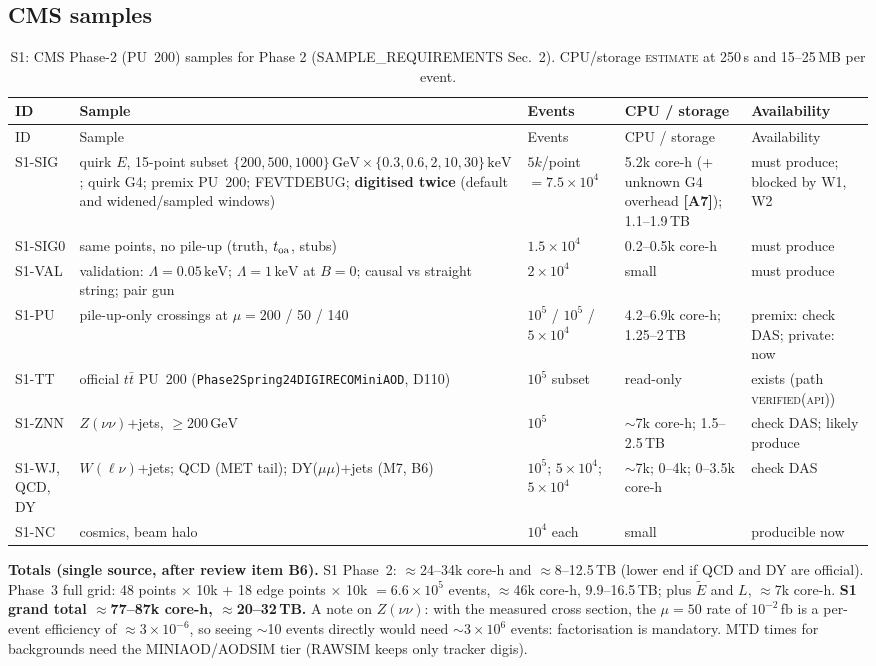 \documentclass[11pt,a4paper]{article}
\newcommand{\EST}{\textsc{estimate}}
\newcommand{\VAPI}{\textsc{verified(api)}}
\newcommand{\GeV}{\,\mathrm{GeV}}
\newcommand{\keV}{\,\mathrm{keV}}
\newcommand{\lab}[1]{\textbf{[#1]}}
\begin{document}
\subsection{CMS samples}
{\small
\begin{longtable}{@{}L{1.41cm}L{5.44cm}L{3.02cm}L{3.33cm}L{2.62cm}@{}}
\caption{S1: CMS Phase-2 (PU~200) samples for Phase 2 (SAMPLE\_REQUIREMENTS Sec.~2). CPU/storage \EST{} at 250\,s and 15--25\,MB per event.}\label{tab:s1}\\
\toprule ID & Sample & Events & CPU / storage & Availability\\\midrule\endfirsthead
\toprule ID & Sample & Events & CPU / storage & Availability\\\midrule\endhead
\bottomrule\endfoot
S1-SIG & quirk $E$, 15-point subset $\{200,500,1000\}\GeV\times\{0.3,0.6,2,10,30\}\keV$; quirk G4; premix PU~200; FEVTDEBUG; \textbf{digitised twice} (default and widened/sampled windows) & $5k$/point $=7.5\times10^4$ & 5.2k core-h (+ unknown G4 overhead \lab{A7}); 1.1--1.9\,TB & must produce; blocked by W1, W2\\
S1-SIG0 & same points, no pile-up (truth, $t_{\rm oa}$, stubs) & $1.5\times10^4$ & 0.2--0.5k core-h & must produce\\
S1-VAL & validation: $\Lambda=0.05\keV$; $\Lambda=1\keV$ at $B=0$; causal vs straight string; pair gun & $2\times10^4$ & small & must produce\\
S1-PU & pile-up-only crossings at $\mu=200$ / 50 / 140 & $10^5$ / $10^5$ / $5\times10^4$ & 4.2--6.9k core-h; 1.25--2\,TB & premix: check DAS; private: now\\
S1-TT & official $t\bar t$ PU~200 (\texttt{Phase2Spring24\allowbreak DIGIRECO\allowbreak MiniAOD}, D110) & $10^5$ subset & read-only & exists (path \VAPI)\\
S1-ZNN & $Z(\nu\nu)$+jets, $\geq200\GeV$ & $10^5$ & $\sim$7k core-h; 1.5--2.5\,TB & check DAS; likely produce\\
S1-WJ, QCD, DY & $W(\ell\nu)$+jets; QCD (MET tail); DY($\mu\mu$)+jets (M7, B6) & $10^5$; $5\times10^4$; $5\times10^4$ & $\sim$7k; 0--4k; 0--3.5k core-h & check DAS\\
S1-NC & cosmics, beam halo & $10^4$ each & small & producible now\\
\end{longtable}
}
\textbf{Totals (single source, after review item B6).} S1 Phase~2: $\approx$24--34k core-h and $\approx$8--12.5\,TB (lower end if QCD and DY are official). Phase~3 full grid: 48 points $\times$ 10k + 18 edge points $\times$ 10k $=6.6\times10^5$ events, $\approx$46k core-h, 9.9--16.5\,TB; plus $\tilde E$ and $L$, $\approx$7k core-h. \textbf{S1 grand total $\approx$77--87k core-h, $\approx$20--32\,TB.} A note on $Z(\nu\nu)$: with the measured cross section, the $\mu=50$ rate of $10^{-2}$\,fb is a per-event efficiency of $\approx3\times10^{-6}$, so seeing $\sim$10 events directly would need $\sim3\times10^6$ events: factorisation is mandatory. MTD times for backgrounds need the MINIAOD/AODSIM tier (RAWSIM keeps only tracker digis).
\end{document}
